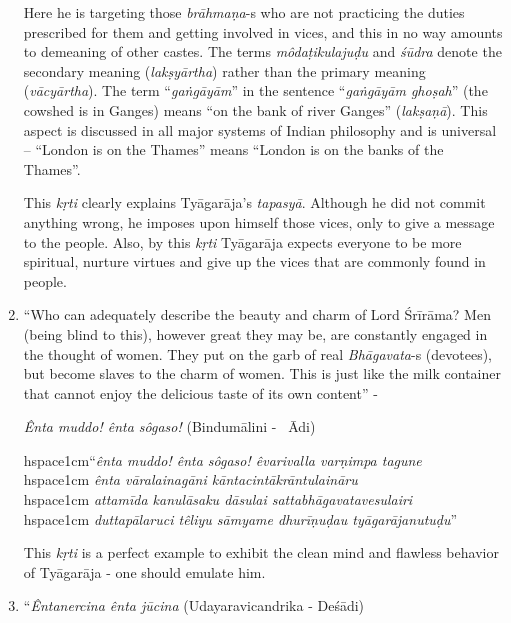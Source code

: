 \begin{enumerate}
 Here he is targeting those \textit{brāhmaṇa}-s who are not practicing the duties prescribed for them and getting involved in vices, and this in no way amounts to demeaning of other castes. The terms \textit{môdaṭikulajuḍu} and \textit{śūdra} denote the secondary meaning (\textit{lakṣyārtha}) rather than the primary meaning (\textit{vācyārtha}). The term “\textit{gaṅgāyām}” in the sentence “\textit{gaṅgāyām ghoṣah}” (the cowshed is in Ganges) means “on the bank of river Ganges” (\textit{lakṣaṇā}). This aspect is discussed in all major systems of Indian philosophy and is universal – “London is on the Thames” means “London is on the banks of the Thames”.

 This \textit{kṛti} clearly explains Tyāgarāja’s \textit{tapasyā}. Although he did not commit anything wrong, he imposes upon himself those vices, only to give a message to the people. Also, by this \textit{kṛti} Tyāgarāja expects everyone to be more spiritual, nurture virtues and give up the vices that are commonly found in people.

 \item 
 “Who can adequately describe the beauty and charm of Lord Śrīrāma? Men (being blind to this), however great they may be, are constantly engaged in the thought of women. They put on the garb of real \textit{Bhāgavata}-s (devotees), but become slaves to the charm of women. This is just like the milk container that cannot enjoy the delicious taste of its own content” -

 \textit{Ênta muddo! ênta sôgaso!} (Bindumālini -  Ādi)

\begin{myquote}
hspace{1cm}“\textit{ênta muddo! ênta sôgaso! êvarivalla varṇimpa tagune}\\hspace{1cm} \textit{ênta vāralainagāni kāntacintākrāntulaināru}\\hspace{1cm} \textit{attamīda kanulāsaku dāsulai sattabhāgavatavesulairi}\\hspace{1cm} \textit{duttapālaruci têliyu sāmyame dhurīṇuḍau tyāgarājanutuḍu}”
\end{myquote}

 This \textit{kṛti} is a perfect example to exhibit the clean mind and flawless behavior of Tyāgarāja - one should emulate him.

 \item 
 “\textit{Êntanercina ênta jūcina} (Udayaravicandrika - Deśādi)


\end{enumerate}
